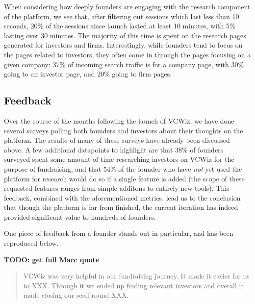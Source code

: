 When considering how deeply founders are engaging with the research component of the platform, we see that, after filtering out sessions which last less than 10 seconds, 20\% of the sessions since launch lasted at least 10 minutes, with 5\% lasting over 30 minutes. The majority of this time is spent on the research pages generated for investors and firms. Interestingly, while founders tend to focus on the pages related to investors, they often come in through the pages focusing on a given company: 37\% of incoming search traffic is for a company page, with 30\% going to an investor page, and 20\% going to firm pages.

\subsection{Feedback}

Over the course of the months following the launch of VCWiz, we have done several surveys polling both founders and investors about their thoughts on the platform. The results of many of these surveys have already been discussed above. A few additional datapoints to highlight are that 38\% of founders surveyed spent some amount of time researching investors on VCWiz for the purpose of fundraising, and that 54\% of the founder who have \textit{not} yet used the platform for research would do so if a single feature is added (the scope of these requested features ranges from simple additons to entirely new tools). This feedback, combined with the aforementioned metrics, lead us to the conclusion that though the platform is far from finished, the current iteration has indeed provided significant value to hundreds of founders.

One piece of feedback from a founder stands out in particular, and has been reproduced below.

\textbf{TODO: get full Marc quote}

\begin{quote}
VCWiz was very helpful in our fundraising journey. It made it easier for us to XXX. Through it we ended up finding relevant investors and overall it made closing our seed round XXX.
\end{quote}

